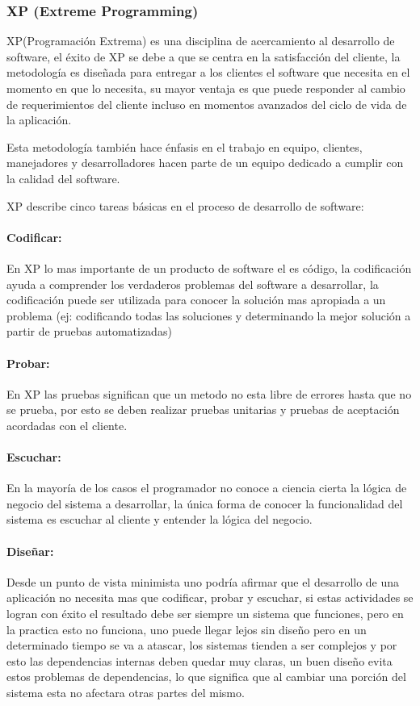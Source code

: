 \subsubsection*{XP (Extreme Programming) \cite{xp} }

XP(Programación Extrema) es una disciplina de acercamiento al desarrollo de software, el éxito de XP se debe a que se centra en la satisfacción del cliente, la metodología es diseñada para entregar a los clientes el software que necesita en el momento en que lo necesita, su mayor ventaja es que puede responder al cambio de requerimientos del cliente incluso en momentos avanzados del ciclo de vida de la aplicación.

Esta metodología también hace énfasis en el trabajo en equipo, clientes, manejadores y desarrolladores hacen parte de un equipo dedicado a cumplir con la calidad del software.

XP describe cinco tareas básicas en el proceso de desarrollo de software:

\paragraph{Codificar:} En XP lo mas importante de un producto de software el es código, la codificación ayuda a comprender los verdaderos problemas del software a desarrollar, la codificación puede ser utilizada para conocer la solución mas apropiada a un problema (ej: codificando todas las soluciones y determinando la mejor solución a partir de pruebas automatizadas)

\paragraph{Probar:} En XP las pruebas significan que un metodo no esta libre de errores hasta que no se prueba, por esto se deben realizar pruebas unitarias y pruebas de aceptación acordadas con el cliente.

\paragraph{Escuchar:} En la mayoría de los casos el programador no conoce a ciencia cierta la lógica de negocio del sistema a desarrollar, la única forma de conocer la funcionalidad del sistema es escuchar al cliente y entender la lógica del negocio.

\paragraph{Diseñar:} Desde un punto de vista minimista uno podría afirmar que el desarrollo de una aplicación no necesita mas que codificar, probar y escuchar, si estas actividades se logran con éxito el resultado debe ser siempre un sistema que funciones, pero en la practica esto no funciona, uno puede llegar lejos sin diseño pero en un determinado tiempo se va a atascar, los sistemas tienden a ser complejos y por esto las dependencias internas deben quedar muy claras, un buen diseño evita estos problemas de dependencias, lo que significa que al cambiar una porción del sistema esta no afectara otras partes del mismo.

